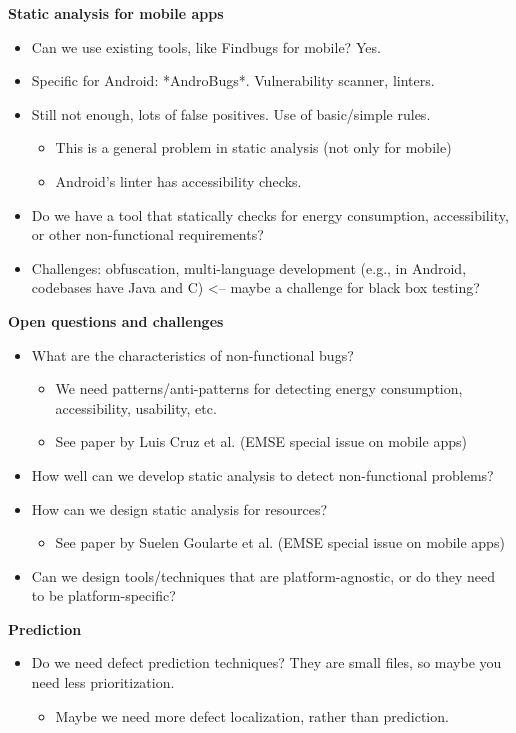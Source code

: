 \documentclass[a4paper]{article}
\begin{document}
\textbf{Static analysis for mobile apps}

\begin{itemize}
\item Can we use existing tools, like Findbugs for mobile? Yes.
\item Specific for Android: *AndroBugs*. Vulnerability scanner, linters.
\item Still not enough, lots of false positives. Use of basic/simple rules.
	\begin{itemize}
	\item This is a general problem in static analysis (not only for mobile)
	\item Android's linter has accessibility checks.
	\end{itemize}
\item Do we have a tool that statically checks for energy consumption, accessibility, or other non-functional requirements?
\item Challenges: obfuscation, multi-language development (e.g., in Android, codebases have Java and C) <-- maybe a challenge for black box testing?
\end{itemize}

\textbf{Open questions and challenges}

\begin{itemize}
\item What are the characteristics of non-functional bugs?
	\begin{itemize}
	\item We need patterns/anti-patterns for detecting energy consumption, accessibility, usability, etc.
	\item See paper by Luis Cruz et al. (EMSE special issue on mobile apps)
	\end{itemize}
\item How well can we develop static analysis to detect non-functional problems?
\item How can we design static analysis for resources?
	\begin{itemize}
	\item See paper by Suelen Goularte et al. (EMSE special issue on mobile apps)
	\end{itemize}
\item Can we design tools/techniques that are platform-agnostic, or do they need to be platform-specific?
\end{itemize}


\textbf{Prediction}

\begin{itemize}
\item Do we need defect prediction techniques? They are small files, so maybe you need less prioritization.
	\begin{itemize}
	\item Maybe we need more defect localization, rather than prediction.
	\end{itemize}
\end{itemize}
\end{document}
